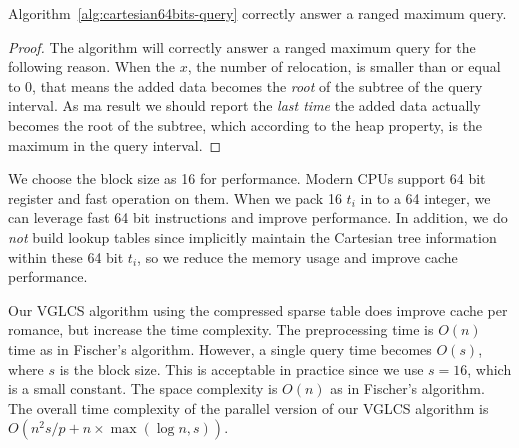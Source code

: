

\begin{theorem}
  Algorithm~\ref{alg:cartesian64bits-query} correctly answer a ranged
  maximum query.
\end{theorem}
\begin{proof}
The algorithm will correctly answer a ranged maximum query for the
following reason.  When the $x$, the number of relocation, is smaller
than or equal to 0, that means the added data becomes the {\em root} of
the subtree of the query interval.  As ma result we should report the
{\em last time} the added data actually becomes the root of the
subtree, which according to the heap property, is the maximum in the
query interval.
\end{proof}

We choose the block size as 16 for performance.  Modern CPUs support
64 bit register and fast operation on them.  When we pack 16 $t_i$ in
to a 64 integer, we can leverage fast 64 bit instructions and improve
performance.  In addition, we do {\em not} build lookup tables since
implicitly maintain the Cartesian tree information within these 64
bit $t_i$, so we reduce the memory usage and improve cache
performance.

\iffalse 因所有 $t_i < 16$，使得每個 $l_i$ 可用 4-bit 表示之，整體便可
用 64-bit 長整數表示一棵笛卡爾樹的狀態。為了現在常見的 64-byte 快取列
(cache line) 和 64-bit 暫存器 (register) 考量，我們選用合適的大小進行
測試，不僅壓縮空間使用量，同時也減少快取未中的問題。最後，我們得到壓縮
算法 \ref{alg:cartesian-to-64bits}，其相對應的區間查找算法，根據
Demaine \cite{demaine} 進行修改，得到壓縮下的詢問算法
\ref{alg:cartesian64bits-query}。\fi

Our VGLCS algorithm using the compressed sparse table does improve
cache per romance, but increase the time complexity.  The
preprocessing time is $O(n)$ time as in Fischer's algorithm.  However,
a single query time becomes $O(s)$, where $s$ is the block size.  This
is acceptable in practice since we use $s = 16$, which is a small
constant.  The space complexity is $O(n)$ as in Fischer's algorithm.
The overall time complexity of the parallel version of our VGLCS
algorithm is $O(n^2 s / p + n \times \max(\log n, s))$.

\iffalse
回到 VGLCS 的應用中，上述算法使用壓縮方式降低快取未中。
我們可以使用上述的算法取代原先的并查集，建表的時間複雜度為 $O(n)$，
單一查詢的時間複雜度為 $O(s)$。
整體的時間複雜度為 $O(n^2 \; s / p + n \max(\log n, s))$。
\fi
